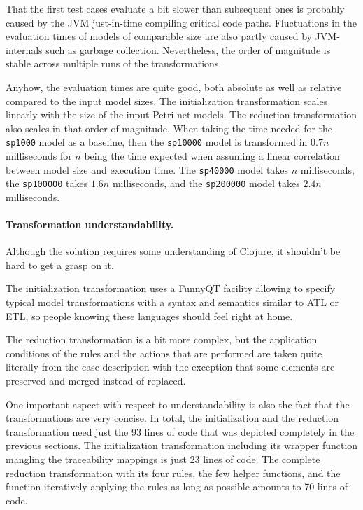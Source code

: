 \documentclass[submission]{eptcs}
\begin{document}
That the first test cases evaluate a bit slower than subsequent ones is
probably caused by the JVM just-in-time compiling critical code paths.
Fluctuations in the evaluation times of models of comparable size are also
partly caused by JVM-internals such as garbage collection.  Nevertheless, the
order of magnitude is stable across multiple runs of the transformations.

Anyhow, the evaluation times are quite good, both absolute as well as relative
compared to the input model sizes.  The initialization transformation scales
linearly with the size of the input Petri-net models.  The reduction
transformation also scales in that order of magnitude.  When taking the time
needed for the \verb|sp1000| model as a baseline, then the \verb|sp10000| model
is transformed in $0.7n$ milliseconds for $n$ being the time expected when
assuming a linear correlation between model size and execution time.  The
\verb|sp40000| model takes $n$ milliseconds, the \verb|sp100000| takes $1.6n$
milliseconds, and the \verb|sp200000| model takes $2.4n$ milliseconds.

\paragraph{Transformation understandability.}

Although the solution requires some understanding of Clojure, it shouldn't be
hard to get a grasp on it.

The initialization transformation uses a FunnyQT facility allowing to specify
typical model transformations with a syntax and semantics similar to ATL or
ETL, so people knowing these languages should feel right at home.

The reduction transformation is a bit more complex, but the application
conditions of the rules and the actions that are performed are taken quite
literally from the case description with the exception that some elements are
preserved and merged instead of replaced.

One important aspect with respect to understandability is also the fact that
the transformations are very concise.  In total, the initialization and the
reduction transformation need just the 93 lines of code that was depicted
completely in the previous sections.  The initialization transformation
including its wrapper function mangling the traceability mappings is just 23
lines of code.  The complete reduction transformation with its four rules, the
few helper functions, and the function iteratively applying the rules as long
as possible amounts to 70 lines of code.
\end{document}
